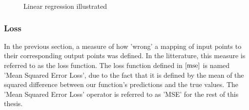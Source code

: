 \begin{figure}
    \centering
    \qquad
    \caption{Linear regression illustrated}%
    \label{fig:linearRegression}%
\end{figure}



\subsubsection{Loss}

In the previous section, a measure of how 'wrong' a mapping of input points to their corresponding output points was defined.
In the litterature, this measure is referred to as the loss function. 
The loss function defined in $ \eqref{mse} $ is named 'Mean Squared Error Loss', 
due to the fact that it is defined by the mean of the squared difference between our function's predictions and the true values.
The 'Mean Squared Error Loss' operator is referred to as 'MSE' for the rest of this thesis.

